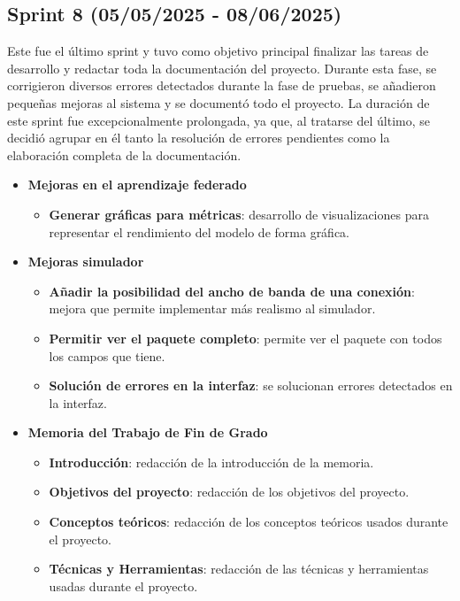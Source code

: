 \subsection{Sprint 8 (05/05/2025 - 08/06/2025)}
\label{subsec:OctavoSprint}
Este fue el último sprint y tuvo como objetivo principal finalizar las tareas de desarrollo y redactar toda la documentación del proyecto. Durante esta fase, se corrigieron diversos errores detectados durante la fase de pruebas, se añadieron pequeñas mejoras al sistema y se documentó todo el proyecto. La duración de este sprint fue excepcionalmente prolongada, ya que, al tratarse del último, se decidió agrupar en él tanto la resolución de errores pendientes como la elaboración completa de la documentación.

\begin{itemize}
    \item \textbf{Mejoras en el aprendizaje federado}
    \begin{itemize}
        \item \textbf{Generar gráficas para métricas}: desarrollo de visualizaciones para representar el rendimiento del modelo de forma gráfica.
    \end{itemize}
    \item \textbf{Mejoras simulador}
    \begin{itemize}
        \item \textbf{Añadir la posibilidad del ancho de banda de una conexión}: mejora que permite implementar más realismo al simulador.
        \item \textbf{Permitir ver el paquete completo}: permite ver el paquete con todos los campos que tiene.
        \item \textbf{Solución de errores en la interfaz}: se solucionan errores detectados en la interfaz.
    \end{itemize}
    \item \textbf{Memoria del Trabajo de Fin de Grado}
    \begin{itemize}
        \item \textbf{Introducción}: redacción de la introducción de la memoria.
        \item \textbf{Objetivos del proyecto}: redacción de los objetivos del proyecto.
        \item \textbf{Conceptos teóricos}: redacción de los conceptos teóricos usados durante el proyecto.
        \item \textbf{Técnicas y Herramientas}: redacción de las técnicas y herramientas usadas durante el proyecto.

\end{itemize}
\end{itemize}
